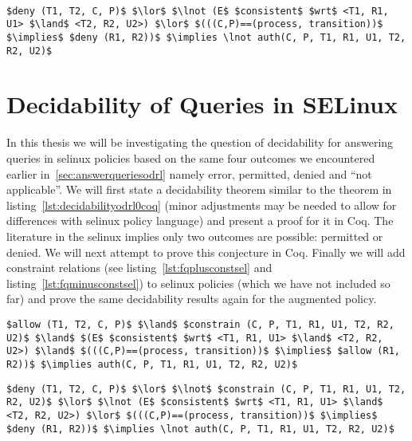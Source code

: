 \lstset{mathescape, language=AST} 
\begin{lstlisting}[frame=single, caption={$f^{-}_q$ for \ac{selinux}},label={lst:fqminussel}]

$deny (T1, T2, C, P)$ $\lor$ $\lnot (E$ $consistent$ $wrt$ <T1, R1, U1> $\land$ <T2, R2, U2>) $\lor$ $(((C,P)==(process, transition))$ $\implies$ $deny (R1, R2))$ $\implies \lnot auth(C, P, T1, R1, U1, T2, R2, U2)$ 

\end{lstlisting}

\section{Decidability of Queries in SELinux}

In this thesis we will be investigating the question of decidability for answering queries in \ac{selinux} policies based on the same four outcomes we encountered earlier in~\ref{sec:answerqueriesodrl} namely error, permitted, denied and ``not applicable''. We will first state a decidability theorem similar to the theorem in listing~\ref{lst:decidabilityodrl0coq} (minor adjustments may be needed to allow for differences with \ac{selinux} policy language) and present a proof for it in Coq. The literature in the \ac{selinux} implies only two outcomes are possible: permitted or denied. We will next attempt to prove this conjecture in Coq. Finally we will add constraint relations (see listing~\ref{lst:fqplusconstsel} and listing~\ref{lst:fqminusconstsel}) to \ac{selinux} policies (which we have not included so far) and prove the same decidability results again for the augmented policy.

\lstset{mathescape, language=AST} 
\begin{lstlisting}[frame=single, caption={$f^{+}_q$ for \ac{selinux}},label={lst:fqplusconstsel}]
$allow (T1, T2, C, P)$ $\land$ $constrain (C, P, T1, R1, U1, T2, R2, U2)$ $\land$ $(E$ $consistent$ $wrt$ <T1, R1, U1> $\land$ <T2, R2, U2>) $\land$ $(((C,P)==(process, transition))$ $\implies$ $allow (R1, R2))$ $\implies auth(C, P, T1, R1, U1, T2, R2, U2)$ 

\end{lstlisting}

\lstset{mathescape, language=AST} 
\begin{lstlisting}[frame=single, caption={$f^{-}_q$ for \ac{selinux}},label={lst:fqminusconstsel}]
$deny (T1, T2, C, P)$ $\lor$ $\lnot$ $constrain (C, P, T1, R1, U1, T2, R2, U2)$ $\lor$ $\lnot (E$ $consistent$ $wrt$ <T1, R1, U1> $\land$ <T2, R2, U2>) $\lor$ $(((C,P)==(process, transition))$ $\implies$ $deny (R1, R2))$ $\implies \lnot auth(C, P, T1, R1, U1, T2, R2, U2)$ 

\end{lstlisting}
